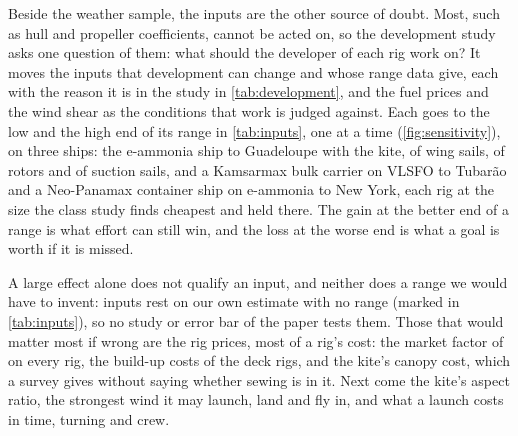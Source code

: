 Beside the weather sample, the inputs are the other source of doubt. Most, such as hull and propeller coefficients, cannot be acted on, so the development study asks one question of them: what should the developer of each rig work on? It moves the  inputs that development can change and whose range data give, each with the reason it is in the study in \cref{tab:development}, and the fuel prices and the wind shear as the conditions that work is judged against. Each goes to the low and the high end of its range in \cref{tab:inputs}, one at a time (\cref{fig:sensitivity}), on three ships: the  e-ammonia ship to Guadeloupe with the  kite,  of wing sails,  of rotors and  of suction sails, and a Kamsarmax bulk carrier on VLSFO to Tubarão and a Neo-Panamax container ship on e-ammonia to New York, each rig at the size the class study finds cheapest and held there. The gain at the better end of a range is what effort can still win, and the loss at the worse end is what a goal is worth if it is missed.

A large effect alone does not qualify an input, and neither does a range we would have to invent:  inputs rest on our own estimate with no range (marked in \cref{tab:inputs}), so no study or error bar of the paper tests them. Those that would matter most if wrong are the rig prices, most of a rig's cost: the market factor of  on every rig, the build-up costs of the deck rigs, and the kite's canopy cost, which a survey gives without saying whether sewing is in it. Next come the kite's aspect ratio, the strongest wind it may launch, land and fly in, and what a launch costs in time, turning and crew.

{\footnotesize
\setlength{\LTcapwidth}{\textwidth}
\setlength{\extrarowheight}{1.5pt}
 
}


